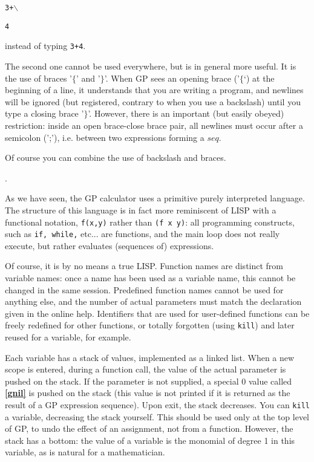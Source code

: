 {\tt 3+$\backslash$}

{\tt 4}

instead of typing {\tt 3+4}.

The second one cannot be used everywhere, but is in general more useful. It is the use
of braces  '$\{$' and  '$\}$'. When GP sees an opening brace ('$\{$`) at the beginning
of a line, it understands that you are writing a program, and newlines will be ignored
(but registered, contrary to when you use a backslash) until you type a closing brace
'$\}$'. However, there is an important (but easily obeyed) restriction: inside an
open brace-close brace pair, all newlines must occur after a semicolon (';'), i.e.
between two expressions forming a $seq$.

Of course you can combine the use of backslash and braces.

.

As we have seen, the GP calculator uses a primitive purely interpreted language.
The structure of this language is in fact more reminiscent of LISP with a functional
notation, {\tt f(x,y)} rather than {\tt (f x y)}: all programming constructs,
such as {\tt if, while,} etc... are functions, and the main loop does not really
execute, but rather evaluates (sequences of) expressions.

Of course, it is by no means a true LISP. Function names are distinct from variable
names: once a name has been used as a variable name, this cannot be changed in the
same session. Predefined function names cannot be used for anything else, and the
number of actual parameters must match the declaration given in the online help.
Identifiers that are used for user-defined functions can be freely redefined for other
functions, or totally forgotten (using {\tt kill}) and later reused for a variable,
for example.

Each variable has a stack of values, implemented as a linked list. When a new
scope is entered, during a function call,
the value of the actual parameter is pushed on the stack. If the parameter is not
supplied, a special $0$ value called {\bf \ref{gnil}} is pushed on the stack
(this value is not printed if it is
returned as the result of a GP expression sequence). Upon exit, the stack decreases.
You can {\tt kill} a variable, decreasing the stack yourself. This should be used
only at the top level of GP, to undo the effect of an assignment,
not from a function. However, the stack has a bottom:
the value of a variable is the monomial of degree 1 in
this variable, as is natural for a mathematician.

